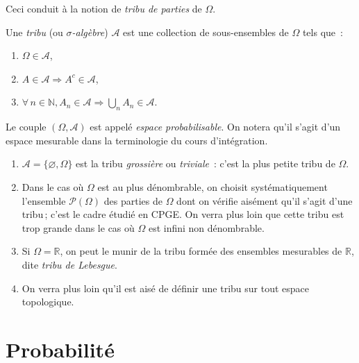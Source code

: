 Ceci conduit à la notion de \emph{tribu de parties} de \(\Omega\).

\begin{definition}[{Tribu}]\label{I-deftribu}

Une \emph{tribu} (ou \emph{\(\sigma\)-algèbre}) \(\mathcal{A}\) est une
collection de sous-ensembles de \(\Omega\) tels que~:

\begin{enumerate}
\def\labelenumi{\arabic{enumi}.}
\tightlist
\item
  \(\Omega \in \mathcal{A}\),
\item
  \(A \in \mathcal{A}\Rightarrow A^c \in \mathcal{A}\),
\item
  \(\forall\, n \in \mathbb{N}, A_n \in \mathcal{A}\Rightarrow \bigcup_n A_n \in \mathcal{A}\).
\end{enumerate}
\end{definition}

Le couple \((\Omega, \mathcal{A})\) est appelé \emph{espace
probabilisable}. On notera qu'il s'agit d'un espace mesurable dans la
terminologie du cours d'intégration.

\begin{exemple}\label{I-exemples-3}
\begin{enumerate}
\def\labelenumi{\arabic{enumi}.}
\tightlist
\item
  \(\mathcal{A}= \{\varnothing,\Omega\}\) est la tribu \emph{grossière}
  ou \emph{triviale}~: c'est la plus petite tribu de \(\Omega\).
\item
  Dans le cas où \(\Omega\) est au plus dénombrable, on choisit
  systématiquement l'ensemble \(\mathcal{P}(\Omega)\) des parties de
  \(\Omega\) dont on vérifie aisément qu'il s'agit d'une tribu\,; c'est
  le cadre étudié en CPGE. On verra plus loin que cette tribu est trop
  grande dans le cas où \(\Omega\) est infini non dénombrable.
\item
  Si \(\Omega = \mathbb{R}\), on peut le munir de la tribu formée des
  ensembles mesurables de \(\mathbb{R}\), dite \emph{tribu de Lebesgue}.
\item
  On verra plus loin qu'il est aisé de définir une tribu sur tout espace
  topologique.
\end{enumerate}
\end{exemple}

\section{Probabilité}\label{I-probabilituxe9}

